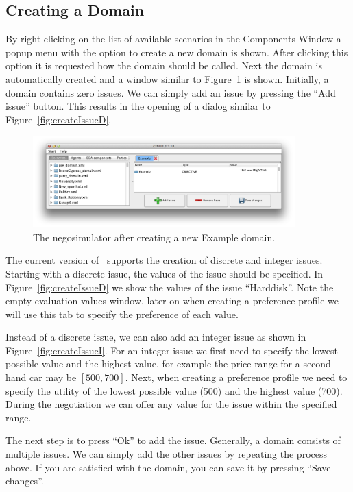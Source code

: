 \documentclass[]{article}
\begin{document}
\subsection{Creating a Domain}
By right clicking on the list of available scenarios in the Components Window a popup menu with the option to create a new domain is shown. After clicking this option it is requested how the domain should be called. Next the domain is automatically created and a window similar to Figure~\ref{Fig:newdomain} is shown. Initially, a domain contains zero issues. We can simply add an issue by pressing the ``Add issue'' button. This results in the opening of a dialog similar to Figure~\ref{fig:createIssueD}.

\begin{figure}[htb]
	\centering
	\includegraphics[width=0.9\textwidth]{media/exampledomain.png}
\caption{The negosimulator after creating a new Example domain.}\label{Fig:newdomain}
\end{figure}

The current version of \Genius~supports the creation of discrete and integer issues. Starting with a discrete issue, the values of the issue should be specified. In Figure~\ref{fig:createIssueD} we show the values of the issue ``Harddisk''. Note the empty evaluation values window, later on when creating a preference profile we will use this tab to specify the preference of each value.

Instead of a discrete issue, we can also add an integer issue as shown in Figure~\ref{fig:createIssueI}. For an integer issue we first need to specify the lowest possible value and the highest value, for example the price range for a second hand car may be $[500, 700]$. Next, when creating a preference profile we need to specify the utility of the lowest possible value (500) and the highest value (700). During the negotiation we can offer any value for the issue within the specified range.

The next step is to press ``Ok'' to add the issue. Generally, a domain consists of multiple issues. We can simply add the other issues by repeating the process above. If you are satisfied with the domain, you can save it by pressing  ``Save changes''.
\end{document}
